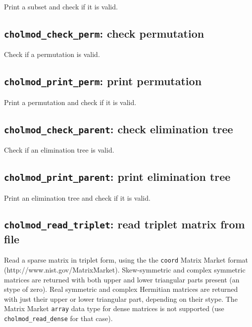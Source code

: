 \documentclass[11pt]{article}
\begin{document}

Print a subset and check if it is valid.

\subsection{{\tt cholmod\_check\_perm}: check permutation}


Check if a permutation is valid.

\subsection{{\tt cholmod\_print\_perm}: print permutation}


Print a permutation and check if it is valid.

\subsection{{\tt cholmod\_check\_parent}: check elimination tree}


Check if an elimination tree is valid.

\subsection{{\tt cholmod\_print\_parent}: print elimination tree}


Print an elimination tree and check if it is valid.

\subsection{{\tt cholmod\_read\_triplet}: read triplet matrix from file}


Read a sparse matrix in triplet form, using the the {\tt coord} Matrix Market
format (http://www.nist.gov/MatrixMarket).  Skew-symmetric and complex
symmetric matrices are returned with both upper and lower triangular parts
present (an stype of zero).  Real symmetric and complex Hermitian matrices are
returned with just their upper or lower triangular part, depending on their
stype.  The Matrix Market {\tt array} data type for dense matrices is not
supported (use {\tt cholmod\_read\_dense} for that case).
\end{document}
